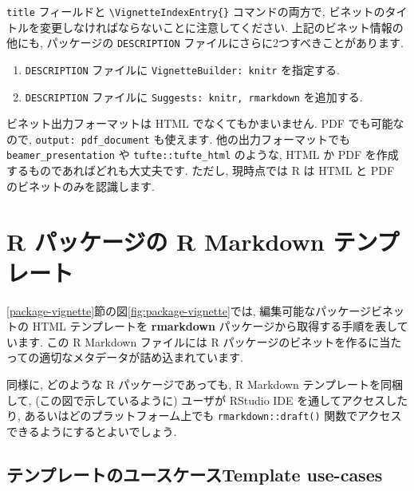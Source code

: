 \documentclass[
  11pt,
  lualatex,
  ja=standard]{bxjsreport}
\begin{document}
\texttt{title} フィールドと \texttt{\textbackslash{}VignetteIndexEntry\{\}} コマンドの両方で, ビネットのタイトルを変更しなければならないことに注意してください. 上記のビネット情報の他にも, パッケージの \texttt{DESCRIPTION} ファイルにさらに2つすべきことがあります.

\begin{enumerate}
\def\labelenumi{\arabic{enumi}.}
\item
  \texttt{DESCRIPTION} ファイルに \texttt{VignetteBuilder: knitr} を指定する.
\item
  \texttt{DESCRIPTION} ファイルに \texttt{Suggests: knitr, rmarkdown} を追加する.
\end{enumerate}

ビネット出力フォーマットは HTML でなくてもかまいません. PDF でも可能なので, \texttt{output: pdf\_document} も使えます. 他の出力フォーマットでも \texttt{beamer\_presentation} や \texttt{tufte::tufte\_html} のような, HTML か PDF を作成するものであればどれも大丈夫です. ただし, 現時点では R は HTML と PDF のビネットのみを認識します.

\hypertarget{package-template}{%
\section{R パッケージの R Markdown テンプレート}\label{package-template}}

\ref{package-vignette}節の図\ref{fig:package-vignette}では, 編集可能なパッケージビネットの HTML テンプレートを \textbf{rmarkdown} パッケージから取得する手順を表しています. この R Markdown ファイルには R パッケージのビネットを作るに当たっての適切なメタデータが詰め込まれています.

同様に, どのような R パッケージであっても, R Markdown テンプレートを同梱して, (この図で示しているように) ユーザが RStudio IDE を通してアクセスしたり, あるいはどのプラットフォーム上でも \texttt{rmarkdown::draft()} 関数でアクセスできるようにするとよいでしょう.

\hypertarget{ux30c6ux30f3ux30d7ux30ecux30fcux30c8ux306eux30e6ux30fcux30b9ux30b1ux30fcux30b9template-use-cases}{%
\subsection{テンプレートのユースケースTemplate use-cases}\label{ux30c6ux30f3ux30d7ux30ecux30fcux30c8ux306eux30e6ux30fcux30b9ux30b1ux30fcux30b9template-use-cases}}
\end{document}
